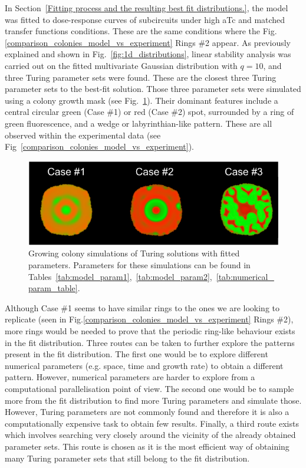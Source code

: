 In Section~\ref{Fitting process and the resulting best fit distributions.}, the model was fitted to dose-response curves of subcircuits under high aTc and matched transfer functions conditions.
These are the same conditions where the Fig.\ref{comparison_colonies_model_vs_experiment} Rings \#2 appear.
As previously explained and shown in Fig.~\ref{fig:1d_distributions}, linear stability analysis was carried out on the fitted multivariate Gaussian distribution with $q=10$, and three Turing parameter sets were found.
These are the closest three Turing parameter sets to the best-fit solution.
Those three parameter sets were simulated using a colony growth mask (see Fig.~\ref{best_fit_colony_turing}).
Their dominant features include a central circular green (Case \#1) or red (Case \#2) spot, surrounded by a ring of green fluorescence, and a wedge or labyrinthian-like pattern.
These are all observed within the experimental data (see Fig~\ref{comparison_colonies_model_vs_experiment}).

\begin{figure}[H]
    \centering

    \includegraphics[width=1\textwidth]{chapters/Chapter 3/best_fit_colony_turing}
    \caption{Growing colony simulations of Turing solutions with fitted parameters. Parameters for these simulations can be found in Tables~\ref{tab:model_param1},~\ref{tab:model_param2},~\ref{tab:numerical_param_table}.}
    \label{best_fit_colony_turing}
\end{figure} %

Although Case \#1 seems to have similar rings to the ones we are looking to replicate (seen in Fig.\ref{comparison_colonies_model_vs_experiment} Rings \#2), more rings would be needed to prove that the periodic ring-like behaviour exists in the fit distribution.
Three routes can be taken to further explore the patterns present in the fit distribution.
The first one would be to explore different numerical parameters (e.g. space, time and growth rate) to obtain a different pattern.
However, numerical parameters are harder to explore from a computational parallelisation point of view.
The second one would be to sample more from the fit distribution to find more Turing parameters and simulate those.
However, Turing parameters are not commonly found and therefore it is also a computationally expensive task to obtain few results.
Finally, a third route exists which involves searching very closely around the vicinity of the already obtained parameter sets.
This route is chosen as it is the most efficient way of obtaining many Turing parameter sets that still belong to the fit distribution.

